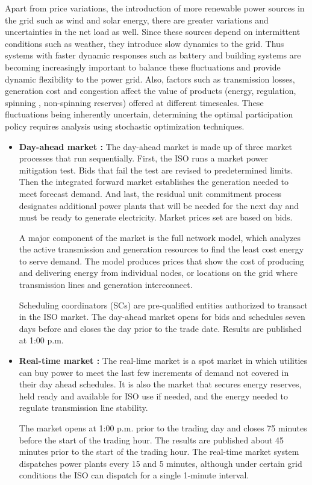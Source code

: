 \documentclass[11pt,twoside]{article}
\begin{document}
Apart from price variations, the introduction of more renewable power sources in the grid such as wind and solar energy, there are greater variations and uncertainties in the net load as well. Since these sources depend on intermittent conditions such as weather, they introduce slow dynamics to the grid. Thus systems with faster dynamic responses such as battery and building systems are becoming increasingly important to balance these fluctuations and provide dynamic flexibility to the power grid. Also, factors such as transmission losses, generation cost and congestion affect the value of products (energy, regulation, spinning , non-spinning reserves) offered at different timescales. These fluctuations being inherently uncertain, determining the optimal participation policy requires analysis using stochastic optimization techniques.
\begin{itemize}
\item \textbf{Day-ahead market :}
The day-ahead market is made up of three market processes that run sequentially. First, the ISO runs a market power mitigation test. Bids that fail the test are revised to predetermined limits. Then the integrated forward market establishes the generation needed to meet forecast demand. And last, the residual unit commitment process designates additional power plants that will be needed for the next day and must be ready to generate electricity. Market prices set are based on bids.

A major component of the market is the full network model, which analyzes the active transmission and generation resources to find the least cost energy to serve demand. The model produces prices that show the cost of producing and delivering energy from individual nodes, or locations on the grid where transmission lines and generation interconnect.

Scheduling coordinators (SCs) are pre-qualified entities authorized to transact in the ISO market. The day-ahead market opens for bids and schedules seven days before and closes the day prior to the trade date. Results are published at 1:00 p.m.

\item \textbf{Real-time market :} 
The real-lime market is a spot market in which utilities can buy power to meet the last few increments of demand not covered in their day ahead schedules. It is also the market that secures energy reserves, held ready and available for ISO use if needed, and the energy needed to regulate transmission line stability.

The market opens at 1:00 p.m. prior to the trading day and closes 75 minutes before the start of the trading hour. The results are published about 45 minutes prior to the start of the trading hour. The real-time market system dispatches power plants every 15 and 5 minutes, although under certain grid conditions the ISO can dispatch for a single 1-minute interval.

\end{itemize}
\end{document}

